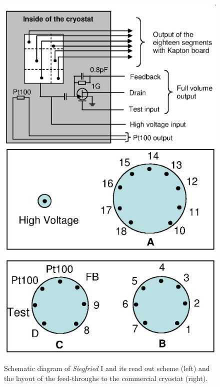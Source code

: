 \begin{figure}[tbhp]
  \centering
  \includegraphics[height=0.25\textheight]{block1}\hfil
  \includegraphics[height=0.25\textheight]{block2}
  \caption{Schematic diagram of \emph{Siegfried} I and its read out     scheme (left) and the layout of the feed-throughs to the     commercial cryostat (right).}
  \label{fig:tt:sif}
\end{figure}

